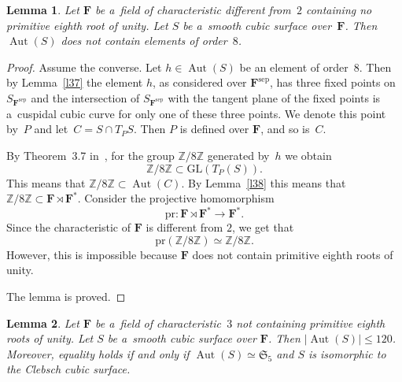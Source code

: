 \documentclass{amsart}
\numberwithin{equation}{section}
\theoremstyle{plain}
\newtheorem{lemma}{Lemma}
\theoremstyle{definition}
\theoremstyle{remark}
\begin{document}
\begin{lemma}
\label{l39}
Let $\mathbf{F}$ be a~field of characteristic different from~$2$ containing no primitive eighth root of unity. Let $S$ be a~smooth cubic surface over~$\mathbf{F}$. Then $\operatorname{Aut}(S)$ does not contain elements of order~$8$.
\end{lemma}

\begin{proof}
Assume the converse. Let $h \in \operatorname{Aut}(S)$ be an element of order~$8$. Then by Lemma~\ref{l37} the element $h$, as considered over $\mathbf{F}^{\mathrm{sep}}$, has three fixed points on $S_{\mathbf{F}^{\mathrm{sep}}}$ and the intersection of $S_{\mathbf{F}^{\mathrm{sep}}}$ with the tangent plane of the fixed points is a~cuspidal cubic curve for only one of these three points. We denote this point by~$P$ and let~\mbox{$C=S \cap T_{P}S$.} Then $P$ is defined over $\mathbf{F}$, and so is~$C$.

By Theorem~3.7 in~\cite{5}, for the group $\mathbb{Z}/8\mathbb{Z}$ generated by~$h$ we obtain
$$
\mathbb{Z}/8\mathbb{Z} \subset \mathrm{GL}(T_P(S)).
$$
This means that $\mathbb{Z}/8\mathbb{Z} \subset \operatorname{Aut}(C)$. By Lemma~\ref{l38} this means that $\mathbb{Z}/8\mathbb{Z} \subset \mathbf{F} \rtimes \mathbf{F}^*$. Consider the projective homomorphism
$$
\mathrm{pr} \colon \mathbf{F} \rtimes \mathbf{F}^* \to \mathbf{F}^*.
$$
 Since the characteristic of $\mathbf{F}$ is different from $2$, we get that
$$
\mathrm{pr}(\mathbb{Z}/8\mathbb{Z}) \simeq \mathbb{Z}/8\mathbb{Z}.
$$
However, this is impossible because $\mathbf{F}$ does not contain primitive eighth roots of unity.

The lemma is proved.
\end{proof}

\begin{lemma}
\label{l40}
Let $\mathbf{F}$ be a~field of characteristic~$3$ not containing primitive eighth roots of unity. Let $S$ be a~smooth cubic surface over $\mathbf{F}$. Then $|{\operatorname{Aut}(S)}| \leqslant 120$. Moreover, equality holds if and only if $\operatorname{Aut}(S) \simeq \mathfrak{S}_5$ and $S$ is isomorphic to the Clebsch cubic surface.
\end{lemma}
\end{document}
